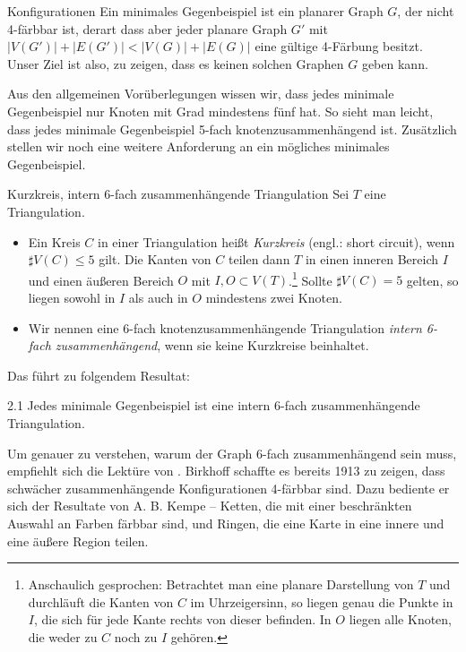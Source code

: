 \begin{section}{Konfigurationen}
 Ein minimales Gegenbeispiel ist ein planarer Graph $G$, der nicht 4-färbbar ist, derart dass aber jeder planare Graph $G'$ mit $|V(G')| + |E(G')| < |V(G)| + |E(G)|$ eine gültige 4-Färbung besitzt. Unser Ziel ist also, zu zeigen, dass es keinen solchen Graphen $G$ geben kann. 
   
 Aus den allgemeinen Vorüberlegungen wissen wir, dass jedes minimale Gegenbeispiel nur Knoten mit Grad mindestens fünf hat. So sieht man leicht, dass jedes minimale Gegenbeispiel 5-fach knotenzusammenhängend ist. Zusätzlich stellen wir noch eine weitere Anforderung an ein mögliches minimales Gegenbeispiel.
 \begin{definition}{Kurzkreis, intern 6-fach zusammenhängende Triangulation}
  Sei $T$ eine Triangulation.
  \begin{itemize}
   \item Ein Kreis $C$ in einer Triangulation heißt \textit{Kurzkreis} (engl.: short circuit), wenn $\sharp V(C) \leq 5$ gilt. Die Kanten von $C$ teilen dann $T$ in einen inneren Bereich $I$ und einen äußeren Bereich $O$ mit $I,O \subset V(T)$.\footnote{Anschaulich gesprochen: Betrachtet man eine planare Darstellung von $T$ und durchläuft die Kanten von $C$ im Uhrzeigersinn, so liegen genau die Punkte in $I$, die sich für jede Kante rechts von dieser befinden. In $O$ liegen alle Knoten, die weder zu $C$ noch zu $I$ gehören.} Sollte $\sharp V(C) = 5$ gelten, so liegen sowohl in $I$ als auch in $O$ mindestens zwei Knoten. 
   \item Wir nennen eine 6-fach knotenzusammenhängende Triangulation \textit{intern 6-fach zusammenhängend}, wenn sie keine Kurzkreise beinhaltet.
  \end{itemize}
 \end{definition}

  Das führt zu folgendem Resultat:
  
 \begin{satzl}{}{2.1}
  Jedes minimale Gegenbeispiel ist eine intern 6-fach zusammenhängende Triangulation. 
 \end{satzl}

 Um genauer zu verstehen, warum der Graph 6-fach zusammenhängend sein muss, empfiehlt sich die Lektüre von \cite{AmJMath35}. Birkhoff schaffte es bereits 1913 zu zeigen, dass schwächer zusammenhängende Konfigurationen 4-färbbar sind. Dazu bediente er sich der Resultate von A. B. Kempe -- Ketten, die mit einer beschränkten Auswahl an Farben färbbar sind, und Ringen, die eine Karte in eine innere und eine äußere Region teilen. 
 

\end{section}
